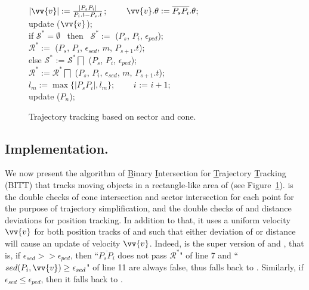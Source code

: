 \begin{figure}[tb!]
\begin{center}
{\begin{minipage}{3.3in}
{					\icc \>\hspace{7ex}    $|\vv{v}|:=\frac{|P_sP_{i}|}{P_{i}.t-P_s.t}$; ~~~~$\vv{v}.\theta:=\overline{P_sP_{i}}.\theta$; \\
					\icc \>\hspace{7ex}    update ($\vv{v}$); \\
					\icc \>\hspace{3ex} if $\mathcal{S}^*=\emptyset$ ~then~ $\mathcal{S}^*:=$ ($P_s$, $P_{i}$, $\epsilon_{ped}$);\\
					\icc \>\hspace{7ex}     $\mathcal{R}^*:=$ ($P_s$, $P_{i}$, $\epsilon_{sed}$, $m$, $P_{s+1}.t$); \\
					\icc \>\hspace{3ex} else $\mathcal{S}^*$ := $\mathcal{S}^*\bigsqcap$ ($P_s$, $P_{i}$, $\epsilon_{ped}$); \\
					\icc \>\hspace{7ex}     $\mathcal{R}^*:=\mathcal{R}^*\bigsqcap$ ($P_s$, $P_{i}$, $\epsilon_{sed}$, $m$, $P_{s+1}.t$);\\
					\icc \>\hspace{3ex} $l_{m} := \max\{|P_sP_{i}|, l_{m}\}$;  ~~~~$i$ := $i +1$;\\
					\icc \>\hspace{0ex} update ($P_{n}$); 
				}
				\vspace{-2ex}
				\myhrule
			\end{minipage}
		}
	\end{center}
	\vspace{-2ex}
	\caption{\small Trajectory tracking based on sector and cone.}
	\label{alg:bitt}
	\vspace{-1ex}
\end{figure}

\subsection{Implementation.}
We now present the algorithm of \underline{B}inary \underline{I}ntersection for \underline{T}rajectory \underline{T}racking (BITT) that tracks moving objects in a rectangle-like area of \bed (see Figure~\ref{alg:bitt}). 
%
\bitt is the double checks of cone intersection and sector intersection for each point for the purpose of trajectory simplification, and the double checks of \sed and \ped distance deviations for position tracking. In addition to that, it uses a uniform velocity $\vv{v}$ for both position tracks of \sed and \ped such that either deviation of \ped or \sed distance will cause an update of velocity $\vv{v}$. 
%
Indeed, \bitt is the super version of \citt and \sitt, that is, if $\epsilon_{sed} >> \epsilon_{ped}$, then ``$\overline{P_sP_{i}}$ does not pass $\mathcal{R}^*$" of line 7 and ``$sed(P_i, \vv{v}) \ge \epsilon_{sed}$" of line 11 are always false, thus \bitt falls back to \sitt. {Similarly, if $\epsilon_{sed} \le \epsilon_{ped}$, then it falls back to \citt.}




